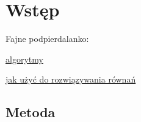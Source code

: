 \section{Wstęp}

Fajne podpierdalanko:

\href{https://people.inf.ethz.ch/gander/papers/qrneu.pdf}{algorytmy}

\href{https://inst.eecs.berkeley.edu/~ee127/sp21/livebook/l_lineqs_solving.html}{jak użyć do rozwiązywania równań}

\subsection{Metoda}